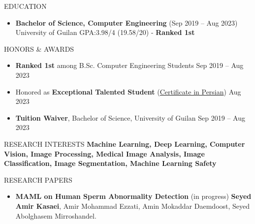 \documentclass[]{CV}
\begin{document}
\resumeheader
{}
{}
{}
{}
{}



\vspace{-2mm}
\begin{section}{EDUCATION}
\begin{itemize}
\item \textbf{Bachelor of Science, Computer Engineering} \hfill (Sep 2019 -- Aug 2023)\newline
{University of Guilan \newline GPA:3.98/4 (19.58/20) - \textbf{Ranked 1st}}
\end{itemize}
\end{section}


\begin{section}{HONORS \& AWARDS}
\begin{itemize}
\item \textbf{Ranked 1st} among B.Sc. Computer Engineering Students \hfill Sep 2019 -- Aug 2023 


\item Honored as \textbf{Exceptional Talented Student} (\href{https://drive.google.com/file/d/1RfuN4xRnWvJ53gFADrlBrSxIEHqgPVWS/view?usp=sharing}{Certificate in Persian}) \hfill Aug 2023

\item \textbf{Tuition Waiver}, Bachelor of Science, University of Guilan \hfill Sep 2019 -- Aug 2023 
\end{itemize}
\end{section}

\begin{section}{RESEARCH INTERESTS}
    \textbf{Machine Learning, Deep Learning, Computer Vision, Image Processing, Medical Image Analysis, Image Classification, Image Segmentation, Machine Learning Safety}
\end{section}

\begin{section}{RESEARCH PAPERS}
\begin{itemize}
\item \textbf{MAML on Human Sperm Abnormality Detection} \hfill (in progress)\newline
\textbf{Seyed Amir Kasaei}, Amir Mohammad  Ezzati, Amin Mokaddar Daemdoost, Seyed Abolghasem Mirroshandel.
\end{itemize}
\end{section}
\end{document}
